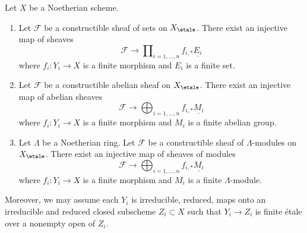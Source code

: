 \begin{lemma}
\label{lemma-constructible-maps-into-constant}
Let $X$ be a Noetherian scheme.
\begin{enumerate}
\item Let $\mathcal{F}$ be a constructible sheaf of sets on $X_\etale$.
There exist an injective map of sheaves
$$
\mathcal{F} \longrightarrow
\prod\nolimits_{i = 1, \ldots, n} f_{i, *}\underline{E_i}
$$
where $f_i : Y_i \to X$ is a finite morphism and $E_i$ is a finite set.
\item Let $\mathcal{F}$ be a constructible abelian sheaf on $X_\etale$.
There exist an injective map of abelian sheaves
$$
\mathcal{F} \longrightarrow
\bigoplus\nolimits_{i = 1, \ldots, n} f_{i, *}\underline{M_i}
$$
where $f_i : Y_i \to X$ is a finite morphism and
$M_i$ is a finite abelian group.
\item Let $\Lambda$ be a Noetherian ring.
Let $\mathcal{F}$ be a constructible sheaf of $\Lambda$-modules on $X_\etale$.
There exist an injective map of sheaves of modules
$$
\mathcal{F} \longrightarrow
\bigoplus\nolimits_{i = 1, \ldots, n} f_{i, *}\underline{M_i}
$$
where $f_i : Y_i \to X$ is a finite morphism and
$M_i$ is a finite $\Lambda$-module.
\end{enumerate}
Moreover, we may assume each $Y_i$ is irreducible, reduced, maps onto
an irreducible and reduced closed subscheme $Z_i \subset X$ such that
$Y_i \to Z_i$ is finite \'etale over a nonempty open of $Z_i$.
\end{lemma}

